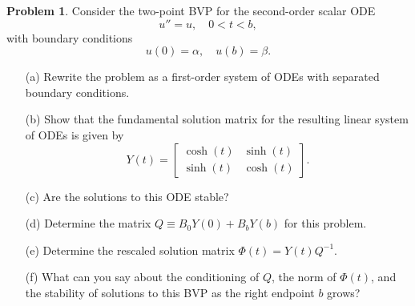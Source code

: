 \documentclass[a4paper]{book}
\numberwithin{equation}{chapter}
\theoremstyle{definition}
\newtheorem{pro}{Problem}
\begin{document}
  \begin{pro}
    Consider the two-point BVP for the second-order scalar ODE
    \begin{displaymath}
      u'' = u, \quad 0<t<b,
    \end{displaymath}
    with boundary conditions
    \begin{displaymath}
      u(0)=\alpha, \quad u(b) = \beta.
    \end{displaymath}
    \begin{itemize}
    \item[(a)]
      Rewrite the problem as a first-order system of ODEs with
      separated boundary conditions.
  
    \item[(b)]
      Show that the fundamental solution matrix for the resulting linear
      system of ODEs is given by
      \begin{displaymath}
        Y(t) =
        \begin{bmatrix}
          \cosh(t) & \sinh(t) \\
          \sinh(t) & \cosh(t)
        \end{bmatrix}.
      \end{displaymath}
  
    \item[(c)]
      Are the solutions to this ODE stable?
  
    \item[(d)]
      Determine the matrix $Q\equiv B_0Y(0)+B_bY(b)$
      for this problem.
  
    \item[(e)]
      Determine the rescaled solution matrix
      $\Phi(t) = Y(t)Q^{-1}$.
  
    \item[(f)]
      What can you say about the conditioning of $Q$,
      the norm of $\Phi(t)$,
      and the stability of solutions to this BVP as the right endpoint $b$ grows?
    \end{itemize}
  \end{pro}
  
\end{document}
